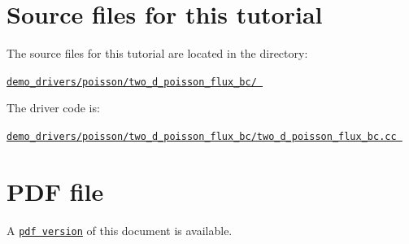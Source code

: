  

\hypertarget{index_sources}{}\section{Source files for this tutorial}\label{index_sources}

\begin{DoxyItemize}
\item The source files for this tutorial are located in the directory\+: \begin{center} \href{../../../../demo_drivers/poisson/two_d_poisson_flux_bc/}{\tt demo\+\_\+drivers/poisson/two\+\_\+d\+\_\+poisson\+\_\+flux\+\_\+bc/ } \end{center} 
\item The driver code is\+: \begin{center} \href{../../../../demo_drivers/poisson/two_d_poisson_flux_bc/two_d_poisson_flux_bc.cc}{\tt demo\+\_\+drivers/poisson/two\+\_\+d\+\_\+poisson\+\_\+flux\+\_\+bc/two\+\_\+d\+\_\+poisson\+\_\+flux\+\_\+bc.\+cc } \end{center} 
\end{DoxyItemize}



 

 \hypertarget{index_pdf}{}\section{P\+D\+F file}\label{index_pdf}
A \href{../latex/refman.pdf}{\tt pdf version} of this document is available. 
